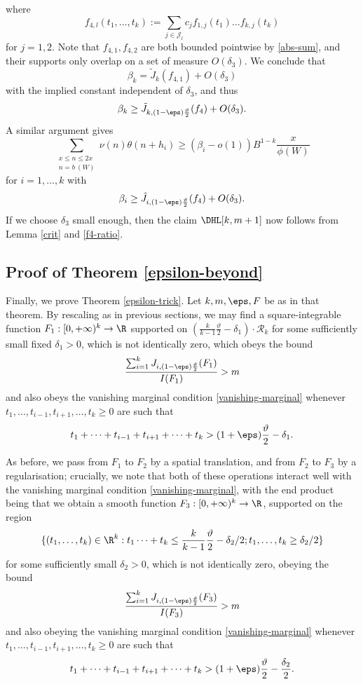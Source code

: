 where
$$ f_{4,l}(t_1,\dots,t_k) :=\sum_{j \in {\mathcal J}_l} c_j f_{1,j}(t_1) \dots f_{k,j}(t_k)$$
for $j=1,2$.  Note that $f_{4,1}, f_{4,2}$ are both bounded pointwise by \eqref{abs-sum}, and their supports only overlap on a set of measure $O( \delta_3 )$.  We conclude that
$$ \beta_k = \tilde J_k( f_{4,1} ) + O(\delta_3)$$
with the implied constant independent of $\delta_3$, and thus
$$ \beta_k \geq \tilde J_{k, (1-\eps) \frac{\vartheta}{2}}( f_4 ) + O(\delta_3).$$
A similar argument gives
$$ 
 \sum_{\substack{x \leq n \leq 2x\\ n = b\ (W)}} \nu(n) \theta(n+h_i) \geq (\beta_i - o(1)) B^{1-k} \frac{x}{\phi(W)}$$
for $i=1,\dots,k$ with
$$ \beta_i \geq \tilde J_{i, (1-\eps) \frac{\vartheta}{2}}( f_4 ) + O(\delta_3).$$
If we choose $\delta_3$ small enough, then the claim $\DHL[k,m+1]$ now follows from Lemma \ref{crit} and \eqref{f4-ratio}.

\subsection{Proof of Theorem \ref{epsilon-beyond}}\label{beyond-sec}

Finally, we prove Theorem \ref{epsilon-trick}. Let $k, m, \eps, F$ be as in that theorem.  By rescaling as in previous sections, we may find
a square-integrable function $F_1: [0,+\infty)^k \to \R$ supported on 
$(\frac{k}{k-1} \frac{\vartheta}{2}-\delta_1) \cdot {\mathcal R}_k$ for some sufficiently small fixed $\delta_1 > 0$, which is not identically zero, which obeys the bound
$$
\frac{\sum_{i=1}^k J_{i,(1-\eps) \frac{\vartheta}{2}}(F_1)}{I(F_1)} > m
$$
and also obeys the vanishing marginal condition \eqref{vanishing-marginal} whenever $t_1,\dots,t_{i-1},t_{i+1},\dots,t_k \geq 0$ are such that
$$ t_1+\dots+t_{i-1}+t_{i+1}+\dots+t_k > (1+\eps) \frac{\vartheta}{2} - \delta_1.$$

As before, we pass from $F_1$ to $F_2$ by a spatial translation, and from $F_2$ to $F_3$ by a regularisation; crucially, we note that both of these operations interact well with the vanishing marginal condition \eqref{vanishing-marginal}, with the end product being that we obtain a smooth function $F_3: [0,+\infty)^k \to \R$, supported on the region
$$
\{ (t_1,\dots,t_k) \in \R^k: t_1 \dots + t_k \leq \frac{k}{k-1} \frac{\vartheta}{2}-\delta_2/2; t_1,\dots,t_k \geq \delta_2/2 \}$$
for some sufficiently small $\delta_2>0$, which is not identically zero, obeying the bound
$$
\frac{\sum_{i=1}^k J_{i,(1-\eps) \frac{\vartheta}{2}}(F_3)}{I(F_3)} > m
$$
and also obeying the vanishing marginal condition \eqref{vanishing-marginal} whenever
$t_1,\dots,t_{i-1},t_{i+1},\dots,t_k \geq 0$ are such that
$$ t_1+\dots+t_{i-1}+t_{i+1}+\dots+t_k > (1+\eps) \frac{\vartheta}{2} - \frac{\delta_2}{2}.$$

